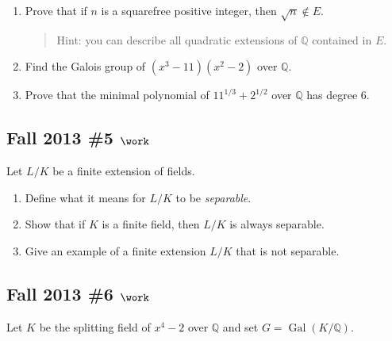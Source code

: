 \begin{enumerate}
\def\labelenumi{\alph{enumi}.}
\item
  Prove that if \(n\) is a squarefree positive integer, then
  \(\sqrt{n}\not\in E\).

  \begin{quote}
  Hint: you can describe all quadratic extensions of \({\mathbb{Q}}\)
  contained in \(E\).
  \end{quote}
\item
  Find the Galois group of \((x^3 - 11)(x^2 - 2)\) over
  \({\mathbb{Q}}\).
\item
  Prove that the minimal polynomial of \(11^{1/3} + 2^{1/2}\) over
  \({\mathbb{Q}}\) has degree 6.
\end{enumerate}

\hypertarget{fall-2013-5-work}{%
\subsection{\texorpdfstring{Fall 2013 \#5
\(\work\)}{Fall 2013 \#5 \textbackslash work}}\label{fall-2013-5-work}}

Let \(L/K\) be a finite extension of fields.

\begin{enumerate}
\def\labelenumi{\alph{enumi}.}
\item
  Define what it means for \(L/K\) to be \emph{separable}.
\item
  Show that if \(K\) is a finite field, then \(L/K\) is always
  separable.
\item
  Give an example of a finite extension \(L/K\) that is not separable.
\end{enumerate}

\hypertarget{fall-2013-6-work}{%
\subsection{\texorpdfstring{Fall 2013 \#6
\(\work\)}{Fall 2013 \#6 \textbackslash work}}\label{fall-2013-6-work}}

Let \(K\) be the splitting field of \(x^4-2\) over \({\mathbb{Q}}\) and
set \(G = { \operatorname{Gal}} (K/{\mathbb{Q}})\).

